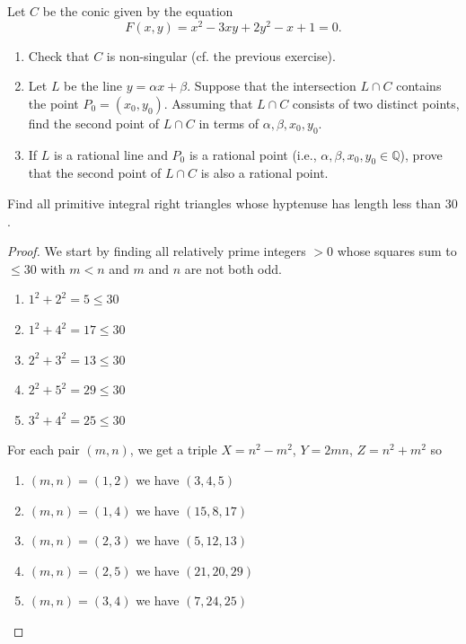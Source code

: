 \begin{tcolorbox}[title=Problem 3, breakable]
    Let $C$ be the conic given by the equation 
    \[F(x,y) = x^2 - 3xy + 2y^2 - x + 1 = 0.\]
    \begin{enumerate}
        \item Check that $C$ is non-singular (cf. the previous exercise).
        \item Let $L$ be the line $y = \alpha x + \beta$. Suppose that the intersection $L \cap C$ contains the point 
        $P_0 = (x_0, y_0)$. Assuming that $L \cap C$ consists of two distinct points, find the second point 
        of $L \cap C$ in terms of $\alpha, \beta, x_0, y_0$.
        \item If $L$ is a rational line and $P_0$ is a rational point (i.e., $\alpha, \beta, x_0, y_0 \in \mathbb{Q}$),
        prove that the second point of $L \cap C$ is also a rational point.
    \end{enumerate}
\end{tcolorbox}

\begin{tcolorbox}[title=Problem 4, breakable]
    Find all primitive integral right triangles 
    whose hyptenuse has length less than $30$.
\end{tcolorbox}

\begin{proof}
    We start by finding all relatively prime integers $>0$
    whose squares sum to $\le 30$ with $m < n$ and $m$ 
    and $n$ are not both odd.
    \begin{enumerate}
        \item $1^2 + 2^2 = 5 \le 30$
        \item $1^2 + 4^2 = 17 \le 30$
        \item $2^2 + 3^2 = 13 \le 30$
        \item $2^2 + 5^2 = 29 \le 30$
        \item $3^2 + 4^2 = 25 \le 30$
    \end{enumerate}
    For each  pair $(m,n)$, we get a triple
    $X = n^2 - m^2$, $Y = 2mn$, $Z = n^2 + m^2$ so
    \begin{enumerate}
        \item $(m,n) = (1,2)$ we have $(3, 4, 5)$
        \item $(m,n) = (1,4)$ we have $(15, 8, 17)$
        \item $(m,n) = (2,3)$ we have $(5, 12, 13)$
        \item $(m,n) = (2,5)$ we have $(21, 20, 29)$
        \item $(m,n) = (3,4)$ we have $(7, 24, 25)$
    \end{enumerate}
\end{proof}

